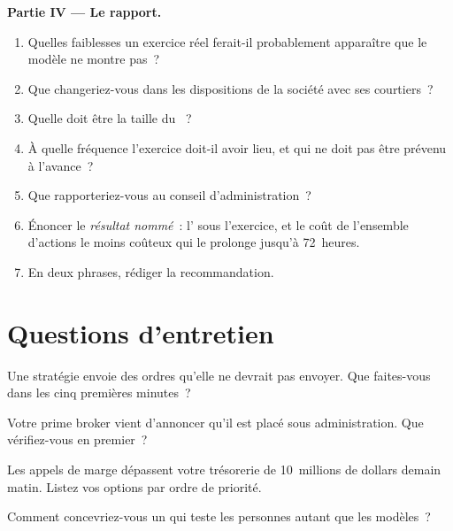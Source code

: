 \begin{problem}
\medskip\noindent\textbf{Partie IV --- Le rapport.}
\begin{enumerate}[resume]
\item Quelles faiblesses un exercice réel ferait-il probablement apparaître que le modèle ne montre pas~?
\item Que changeriez-vous dans les dispositions de la société avec ses courtiers~?
\item Quelle doit être la taille du ~?
\item À quelle fréquence l'exercice doit-il avoir lieu, et qui ne doit pas être prévenu à l'avance~?
\item Que rapporteriez-vous au conseil d'administration~?
\item Énoncer le \emph{résultat nommé}~: l' sous l'exercice, et le coût de l'ensemble d'actions le moins coûteux qui le prolonge jusqu'à 72~heures.
\item En deux phrases, rédiger la recommandation.
\end{enumerate}
\end{problem}

\section{Questions d'entretien}

\begin{interviewq}\label{iq:fm:crisis-management:1}
Une stratégie envoie des ordres qu'elle ne devrait pas envoyer. Que faites-vous dans les cinq premières minutes~?
\end{interviewq}

\begin{interviewq}\label{iq:fm:crisis-management:2}
Votre prime broker vient d'annoncer qu'il est placé sous administration. Que vérifiez-vous en premier~?
\end{interviewq}

\begin{interviewq}\label{iq:fm:crisis-management:3}
Les appels de marge dépassent votre trésorerie de 10~millions de dollars demain matin. Listez vos options par ordre de priorité.
\end{interviewq}

\begin{interviewq}\label{iq:fm:crisis-management:4}
Comment concevriez-vous un  qui teste les personnes autant que les modèles~?
\end{interviewq}

